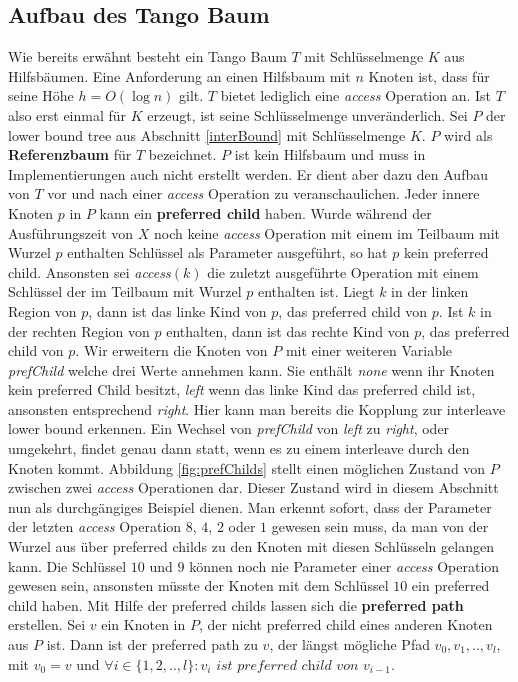 \documentclass[a4paper,12pt]{article}
\begin{document}
\subsection{Aufbau des Tango Baum} \label{aufbauDesTango}
Wie bereits erwähnt besteht ein Tango Baum $T$ mit Schlüsselmenge $K$ aus Hilfsbäumen. Eine Anforderung an einen Hilfsbaum mit $n$ Knoten ist, dass für seine Höhe $h = O\left(\log n\right)$ gilt. $T$ bietet lediglich eine \textit{access} Operation an. Ist $T$ also erst einmal für $K$ erzeugt, ist seine Schlüsselmenge unveränderlich. Sei $P$ der lower bound tree aus Abschnitt \ref{interBound} mit Schlüsselmenge $K$. $P$ wird als \textbf{Referenzbaum} für $T$ bezeichnet. $P$ ist kein Hilfsbaum und muss in Implementierungen auch nicht erstellt werden. Er dient aber dazu den Aufbau von $T$ vor und nach einer \textit{access} Operation zu veranschaulichen. Jeder innere Knoten $p$ in $P$ kann ein \textbf{preferred child} haben.  Wurde während der Ausführungszeit von $X$ noch keine \textit{access} Operation mit einem im Teilbaum mit Wurzel $p$ enthalten Schlüssel als Parameter ausgeführt, so hat $p$ kein preferred child. Ansonsten sei \textit{access}$\left(k\right)$ die zuletzt ausgeführte Operation mit einem Schlüssel der im Teilbaum mit Wurzel $p$ enthalten ist. Liegt $k$ in der linken Region von $p$, dann ist das linke Kind von $p$, das preferred child von $p$. Ist $k$ in der rechten Region von $p$ enthalten, dann ist das rechte Kind von $p$, das preferred child von $p$. Wir erweitern die Knoten von $P$ mit einer weiteren Variable \textit{prefChild} welche drei Werte annehmen kann. Sie enthält \textit{none} wenn ihr Knoten kein preferred Child besitzt, \textit{left} wenn das linke Kind das preferred child ist, ansonsten entsprechend \textit{right}. Hier kann man bereits die Kopplung zur interleave lower bound erkennen. Ein Wechsel von \textit{prefChild}  von \textit{left} zu \textit{right}, oder umgekehrt, findet genau dann statt, wenn es zu einem interleave durch den Knoten kommt. Abbildung \ref{fig:prefChilds} stellt einen möglichen Zustand von $P$ zwischen zwei \textit{access} Operationen dar. Dieser Zustand wird in diesem Abschnitt nun als durchgängiges Beispiel dienen. Man erkennt sofort, dass der Parameter der letzten \textit{access} Operation $8$, $4$, $2$ oder $1$ gewesen sein muss, da man von der Wurzel aus über preferred childs zu den Knoten mit diesen Schlüsseln gelangen kann. Die Schlüssel $10$ und $9$ können noch nie Parameter einer \textit{access} Operation gewesen sein, ansonsten müsste der Knoten mit dem Schlüssel $10$ ein preferred child haben. Mit Hilfe der preferred childs lassen sich die \textbf{preferred path} erstellen. Sei $v$ ein Knoten in $P$, der nicht preferred child eines anderen Knoten aus $P$ ist. Dann ist der preferred path zu $v$, der längst mögliche Pfad $v_0, v_1,..,v_l$, mit $v_0 = v$ und $\forall i \in \{1,2,..,l\} \colon v_i \textit{ ist preferred child von }v_{i-1   }$.  
\end{document}
